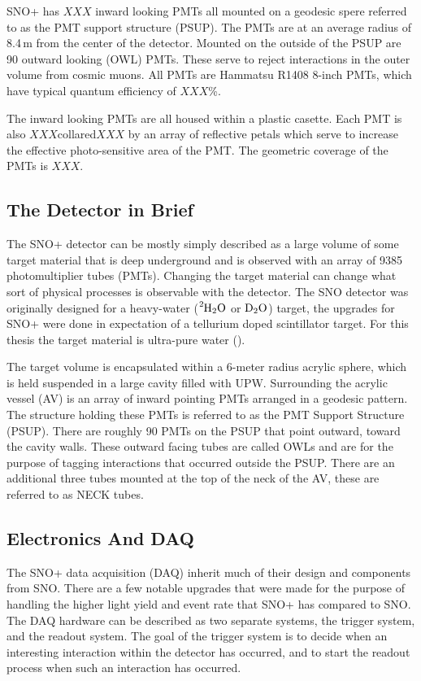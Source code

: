 SNO+ has $XXX$ inward looking PMTs all mounted on a geodesic spere referred to as
the PMT support structure (PSUP). The PMTs are at an average radius of 8.4\,m from
the center of the detector.
Mounted on the outside of the PSUP are 90 outward looking (OWL) PMTs.
These serve to reject interactions in the outer volume from cosmic muons.
All PMTs are Hammatsu R1408 8-inch PMTs, which have typical quantum efficiency
of  $XXX$\%.

The inward looking PMTs are all housed within a plastic casette.
Each PMT is also $XXX$collared$XXX$ by an array of reflective
petals which serve to increase the effective photo-sensitive area
of the PMT.
The geometric coverage of the PMTs is $XXX$. %





\subsection{The Detector in Brief}
The SNO+ detector can be mostly simply described as a large volume of some
target material that is deep underground and is observed with an array of
9385  photomultiplier tubes (PMTs).
Changing the target material can change what sort of physical processes is
observable with the detector.
The SNO detector was originally designed for a heavy-water ($\ce{^{2}H_{2}O}$ or $\ce{D_{2}O}$)
target, the upgrades for SNO+ were done in expectation of a tellurium doped
scintillator target.
For this thesis the target material is ultra-pure water ().

The target volume is encapsulated within a 6-meter radius acrylic sphere,
which is held suspended in a large cavity filled with UPW.
Surrounding the acrylic vessel (AV) is an  array of inward pointing PMTs
arranged in a geodesic pattern.
The structure holding these PMTs is referred to as the PMT Support Structure
(PSUP).
There are roughly 90 PMTs on the PSUP that point outward, toward the cavity
walls.
These outward facing tubes are called OWLs and are for the purpose of tagging
interactions that occurred outside the PSUP.
There are an additional three tubes mounted at the top of the neck of the AV,
these are referred to as NECK tubes.

\subsection{Electronics And DAQ}
The SNO+ data acquisition (DAQ) inherit much of their design and components from
SNO.
There are a few notable upgrades that were made for the purpose of handling the
higher light yield and event rate that SNO+ has compared to SNO.
The DAQ hardware can be described as two separate systems, the trigger system,
and the readout system.
The goal of the trigger system is to decide when an interesting interaction
within the detector has occurred, and to start the readout process when such an
interaction has occurred.

